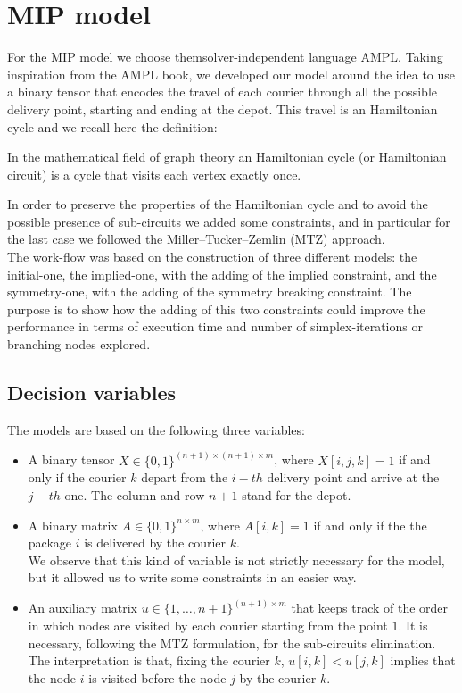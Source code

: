 \section{MIP model}
For the MIP model we choose themsolver-independent language AMPL. Taking inspiration from the AMPL book, we developed our model around the idea to use a binary tensor that encodes the travel of each courier through all the possible delivery point, starting and ending at the depot. This travel is an Hamiltonian cycle and we recall here the definition:
\begin{definition}
In the mathematical field of graph theory an Hamiltonian cycle (or Hamiltonian circuit) is a cycle that visits each vertex exactly once.
\end{definition}
In order to preserve the properties of the Hamiltonian cycle and to avoid the possible presence of sub-circuits we added some constraints, and in particular for the last case we followed the Miller–Tucker–Zemlin (MTZ) approach.\\
The work-flow was based on the construction of three different models: the initial-one, the implied-one, with the adding of the implied constraint, and the symmetry-one, with the adding of the symmetry breaking constraint. The purpose is to show how the adding of this two constraints could improve the performance in terms of execution time and number of simplex-iterations or branching nodes explored.

\subsection{Decision variables}
The models are based on the following three variables:
\begin{itemize}
    \item A binary tensor $X \in \{0,1\}^{(n+1) \times (n+1) \times m}$, where $X[i,j,k] = 1$ if and only if the courier $k$ depart from the $i-th$ delivery point and arrive at the $j-th$ one. The column and row $n+1$ stand for the depot. 
    \item A binary matrix $A \in \{0,1\}^{n \times m}$, where $A[i,k] = 1$ if and only if the the package $i$ is delivered by the courier $k$.\\
    We observe that this kind of variable is not strictly necessary for the model, but it allowed us to write some constraints in an easier way.
    \item An auxiliary matrix $u \in \{1,\dots,n+1\}^{(n+1) \times m}$ that keeps track of the order in which nodes are visited by each courier starting from the point $1$. It is necessary, following the MTZ formulation, for the sub-circuits elimination. The interpretation is that, fixing the courier $k$, $u[i,k] < u[j,k]$ implies that the node $i$ is visited before the node $j$ by the courier $k$.
\end{itemize}


